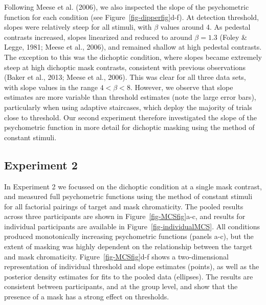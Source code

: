 \documentclass[
  letterpaper,
  DIV=11,
  numbers=noendperiod]{scrartcl}
\begin{document}
Following Meese et al. (2006), we also inspected the slope of the
psychometric function for each condition (see
Figure~\ref{fig-dipperfig}d-f). At detection threshold, slopes were
relatively steep for all stimuli, with \(\beta\) values around 4. As
pedestal contrasts increased, slopes linearized and reduced to around
\(\beta=1.3\) (Foley \& Legge, 1981; Meese et al., 2006), and remained
shallow at high pedestal contrasts. The exception to this was the
dichoptic condition, where slopes became extremely steep at high
dichoptic mask contrasts, consistent with previous observations (Baker
et al., 2013; Meese et al., 2006). This was clear for all three data
sets, with slope values in the range \(4 < \beta < 8\). However, we
observe that slope estimates are more variable than threshold estimates
(note the large error bars), particularly when using adaptive
staircases, which deploy the majority of trials close to threshold. Our
second experiment therefore investigated the slope of the psychometric
function in more detail for dichoptic masking using the method of
constant stimuli.

\hypertarget{experiment-2}{%
\subsection{Experiment 2}\label{experiment-2}}

In Experiment 2 we focussed on the dichoptic condition at a single mask
contrast, and measured full psychometric functions using the method of
constant stimuli for all factorial pairings of target and mask
chromaticity. The pooled results across three participants are shown in
Figure~\ref{fig-MCSfig}a-c, and results for individual participants are
available in Figure~\ref{fig-individualMCS}. All conditions produced
monotonically increasing psychometric functions (panels a-c), but the
extent of masking was highly dependent on the relationship between the
target and mask chromaticity. Figure~\ref{fig-MCSfig}d-f shows a
two-dimensional representation of individual threshold and slope
estimates (points), as well as the posterior density estimates for fits
to the pooled data (ellipses). The results are consistent between
participants, and at the group level, and show that the presence of a
mask has a strong effect on thresholds.
\end{document}
